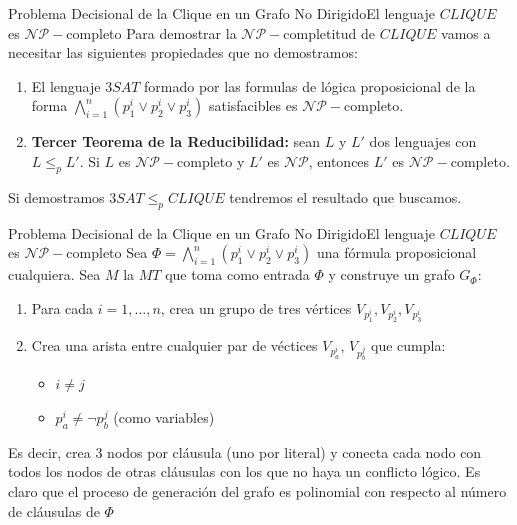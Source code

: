 \documentclass[10pt, envcountsect, presentation, aspectratio=169]{beamer}
\begin{document}
\begin{frame}{Problema Decisional de la Clique en un Grafo No Dirigido}{El lenguaje $CLIQUE$ es $\mathcal{NP}-$completo}
    Para demostrar la $\mathcal{NP}-$completitud de $CLIQUE$ vamos a necesitar las siguientes propiedades que no demostramos:
    \begin{enumerate}[1]
        \item El lenguaje $3SAT$ formado por las formulas de lógica proposicional de la forma $\bigwedge_{i=1}^n(p_1^i \vee p_2^i \vee p_3^i)$ satisfacibles es $\mathcal{NP}-$completo.
        \item \textbf{Tercer Teorema de la Reducibilidad:} sean $L$ y $L'$ dos lenguajes con $L \leq_p L'$. Si $L$ es $\mathcal{NP}-$completo y $L'$ es $\mathcal{NP}$, entonces $L'$ es $\mathcal{NP}-$completo. 
    \end{enumerate}
    Si demostramos $3SAT \leq_p CLIQUE$ tendremos el resultado que buscamos. 
\end{frame}

\begin{frame}{Problema Decisional de la Clique en un Grafo No Dirigido}{El lenguaje $CLIQUE$ es $\mathcal{NP}-$completo}
    Sea $\Phi=\bigwedge_{i=1}^n(p_1^i \vee p_2^i \vee p_3^i)$ una fórmula proposicional cualquiera. Sea $M$ la $MT$ que toma como entrada $\Phi$ y construye un grafo $G_\Phi$:
    \begin{enumerate}
        \item Para cada $i=1,\dots,n$, crea un grupo de tres vértices $V_{p_1^i}, V_{p_2^i}, V_{p_3^i}$
        \item Crea una arista entre cualquier par de véctices $V_{p_a^i}$, $V_{p_b^j}$ que cumpla:
        \begin{itemize}
            \item[] $i \neq j$
            \item[] $p_a^i \neq \neg p_b^j$ (como variables)
        \end{itemize}
    \end{enumerate}
    Es decir, crea 3 nodos por cláusula (uno por literal) y conecta cada nodo con todos los nodos de otras cláusulas con los que no haya un conflicto lógico.
    Es claro que el proceso de generación del grafo es polinomial con respecto al número de cláusulas de $\Phi$
\end{frame}
\end{document}
